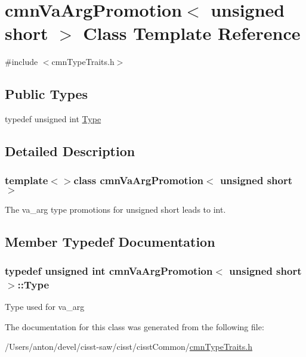 \hypertarget{classcmn_va_arg_promotion_3_01unsigned_01short_01_4}{}\section{cmn\+Va\+Arg\+Promotion$<$ unsigned short $>$ Class Template Reference}
\label{classcmn_va_arg_promotion_3_01unsigned_01short_01_4}


{\ttfamily \#include $<$cmn\+Type\+Traits.\+h$>$}

\subsection*{Public Types}
\begin{DoxyCompactItemize}
\item 
typedef unsigned int \hyperlink{classcmn_va_arg_promotion_3_01unsigned_01short_01_4_abe23760ad365e7207cc1bfb4c50abba7}{Type}
\end{DoxyCompactItemize}


\subsection{Detailed Description}
\subsubsection*{template$<$$>$class cmn\+Va\+Arg\+Promotion$<$ unsigned short $>$}

The va\+\_\+arg type promotions for unsigned short leads to int. 

\subsection{Member Typedef Documentation}
\hypertarget{classcmn_va_arg_promotion_3_01unsigned_01short_01_4_abe23760ad365e7207cc1bfb4c50abba7}{}
\subsubsection[{Type}]{\setlength{\rightskip}{0pt plus 5cm}typedef unsigned int {\bf cmn\+Va\+Arg\+Promotion}$<$ unsigned short $>$\+::{\bf Type}}\label{classcmn_va_arg_promotion_3_01unsigned_01short_01_4_abe23760ad365e7207cc1bfb4c50abba7}
Type used for va\+\_\+arg 

The documentation for this class was generated from the following file\+:\begin{DoxyCompactItemize}
\item 
/\+Users/anton/devel/cisst-\/saw/cisst/cisst\+Common/\hyperlink{cmn_type_traits_8h}{cmn\+Type\+Traits.\+h}\end{DoxyCompactItemize}
